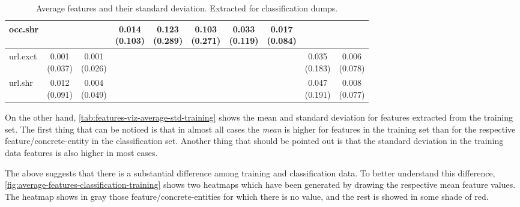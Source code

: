 \documentclass[epsfig,a4paper,11pt,titlepage,twoside,openany]{book}
\begin{document}
\begin{table}[h]
\begin{tabular}{l|c|c|c|c|c|c|c|c|c|}
\multicolumn{1}{|l|}{occ.shr}                  &               &              & \makecell{0.014 \\ (0.103)} & \makecell{0.123 \\ (0.289)} & \makecell{0.103 \\ (0.271)} & \makecell{0.033 \\ (0.119)} & \makecell{0.017 \\ (0.084)} &                 &                \\ \hline
\multicolumn{1}{|l|}{url.exct}                           & \makecell{0.001 \\ (0.037)}  & \makecell{0.001 \\ (0.026)} &              &              &              &              &              & \makecell{0.035 \\ (0.183)}    & \makecell{0.006 \\ (0.078)}   \\ \hline
\multicolumn{1}{|l|}{url.shr}                  & \makecell{0.012 \\ (0.091)}  & \makecell{0.004 \\ (0.049)} &              &              &              &              &              & \makecell{0.047 \\ (0.191)}    & \makecell{0.008 \\ (0.077)}   \\ \hline
\end{tabular}
\caption{Average features and their standard deviation. Extracted for classification dumps.}
\label{tab:features-viz-average-std-classification}
\end{table}


On the other hand, \autoref{tab:features-viz-average-std-training} shows the mean and standard deviation for features extracted from the training set. The first thing that can be noticed is that in almost all cases the \textit{mean} is higher for features in the training set than for the respective feature/concrete-entity in the classification set. Another thing that should be pointed out is that the standard deviation in the training data features is also higher in most cases. 


The above suggests that there is a substantial difference among training and classification data. To better understand this difference, \autoref{fig:average-features-classification-training} shows two heatmaps which have been generated by drawing the respective mean feature values. The heatmap shows in gray those feature/concrete-entities for which there is no value, and the rest is showed in some shade of red. 
\end{document}
